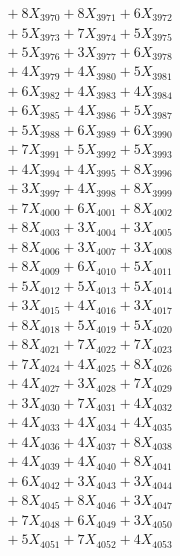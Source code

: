 \documentclass[a4paper,10pt]{article}
\begin{document}
{\begin{align}
&\;  + 8 X_{3970} + 8 X_{3971} + 6 X_{3972} \\[0.3ex]
&\;  + 5 X_{3973} + 7 X_{3974} + 5 X_{3975} \\[0.3ex]
&\;  + 5 X_{3976} + 3 X_{3977} + 6 X_{3978} \\[0.3ex]
&\;  + 4 X_{3979} + 4 X_{3980} + 5 X_{3981} \\[0.3ex]
&\;  + 6 X_{3982} + 4 X_{3983} + 4 X_{3984} \\[0.3ex]
&\;  + 6 X_{3985} + 4 X_{3986} + 5 X_{3987} \\[0.3ex]
&\;  + 5 X_{3988} + 6 X_{3989} + 6 X_{3990} \\[0.3ex]
&\;  + 7 X_{3991} + 5 X_{3992} + 5 X_{3993} \\[0.3ex]
&\;  + 4 X_{3994} + 4 X_{3995} + 8 X_{3996} \\[0.3ex]
&\;  + 3 X_{3997} + 4 X_{3998} + 8 X_{3999} \\[0.5ex]\allowbreak
&\;  + 7 X_{4000} + 6 X_{4001} + 8 X_{4002} \\[0.3ex]
&\;  + 8 X_{4003} + 3 X_{4004} + 3 X_{4005} \\[0.3ex]
&\;  + 8 X_{4006} + 3 X_{4007} + 3 X_{4008} \\[0.3ex]
&\;  + 8 X_{4009} + 6 X_{4010} + 5 X_{4011} \\[0.3ex]
&\;  + 5 X_{4012} + 5 X_{4013} + 5 X_{4014} \\[0.3ex]
&\;  + 3 X_{4015} + 4 X_{4016} + 3 X_{4017} \\[0.3ex]
&\;  + 8 X_{4018} + 5 X_{4019} + 5 X_{4020} \\[0.3ex]
&\;  + 8 X_{4021} + 7 X_{4022} + 7 X_{4023} \\[0.3ex]
&\;  + 7 X_{4024} + 4 X_{4025} + 8 X_{4026} \\[0.3ex]
&\;  + 4 X_{4027} + 3 X_{4028} + 7 X_{4029} \\[0.5ex]\allowbreak
&\;  + 3 X_{4030} + 7 X_{4031} + 4 X_{4032} \\[0.3ex]
&\;  + 4 X_{4033} + 4 X_{4034} + 4 X_{4035} \\[0.3ex]
&\;  + 4 X_{4036} + 4 X_{4037} + 8 X_{4038} \\[0.3ex]
&\;  + 4 X_{4039} + 4 X_{4040} + 8 X_{4041} \\[0.3ex]
&\;  + 6 X_{4042} + 3 X_{4043} + 3 X_{4044} \\[0.3ex]
&\;  + 8 X_{4045} + 8 X_{4046} + 3 X_{4047} \\[0.3ex]
&\;  + 7 X_{4048} + 6 X_{4049} + 3 X_{4050} \\[0.3ex]
&\;  + 5 X_{4051} + 7 X_{4052} + 4 X_{4053} \\[0.3ex]

\end{align}}
\end{document}
